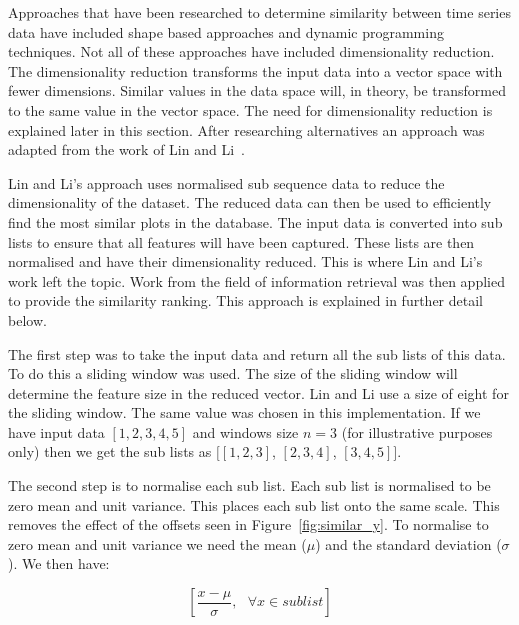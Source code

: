 Approaches that have been researched to determine similarity between time series data have included shape based approaches and dynamic programming~\cite{agrawal, nakamura, keogh} techniques.  Not all of these approaches have included dimensionality reduction.  The dimensionality reduction transforms the input data into a vector space with fewer dimensions.  Similar values in the data space will, in theory, be transformed to the same value in the vector space.  The need for dimensionality reduction is explained later in this section.  After researching alternatives an approach was adapted from the work of Lin and Li~\cite{structural_similarity}.

Lin and Li's approach uses normalised sub sequence data to reduce the dimensionality of the dataset.  The reduced data can then be used to efficiently find the most similar plots in the database.  The input data is converted into sub lists to ensure that all features will have been captured.  These lists are then normalised and have their dimensionality reduced.  This is where Lin and Li's work left the topic.  Work from the field of information retrieval was then applied to provide the similarity ranking. This approach is explained in further detail below.

The first step was to take the input data and return all the sub lists of this data.  To do this a sliding window was used.  The size of the sliding window will determine the feature size in the reduced vector.  Lin and Li use a size of eight for the sliding window.  The same value was chosen in this implementation.  If we have input data $[1,2,3,4,5]$ and windows size $n = 3$ (for illustrative purposes only) then we get the sub lists as $[[1,2,3]$, $[2,3,4]$, $[3,4,5]]$.

The second step is to normalise each sub list.  Each sub list is normalised to be zero mean and unit variance.  This places each sub list onto the same scale.  This removes the effect of the offsets seen in Figure~\ref{fig:similar_y}.  To normalise to zero mean and unit variance we need the mean ($\mu$) and the standard deviation ($\sigma$).  We then have:

$$
\left[\frac{x - \mu}{\sigma},\text{   } \forall x \in sublist\right]
$$


